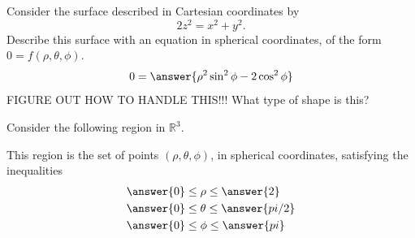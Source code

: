 \documentclass{ximera}
\begin{document}
\begin{problem}
Consider the surface described in Cartesian coordinates by
\[
2z^2 = x^2 +y^2.
\]
Describe this surface with an equation in spherical coordinates, of the form $0=f(\rho, \theta, \phi)$.
\[
0=\answer{\rho^2\sin^2\phi - 2\cos^2\phi}
\]
FIGURE OUT HOW TO HANDLE THIS!!!
What type of shape is this?
\begin{multipleChoice}
\end{multipleChoice}
\end{problem}

\begin{problem}
Consider the following region in $\mathbb{R}^3$.

\begin{image}
\end{image}

This region is the set of points $(\rho,\theta,\phi)$, in spherical coordinates, satisfying the inequalities
\begin{align*}
&\answer{0}\leq\rho\leq \answer{2}\\
&\answer{0}\leq\theta\leq\answer{pi/2}\\
&\answer{0}\leq\phi\leq\answer{pi}
\end{align*}

\end{problem}
\end{document}
